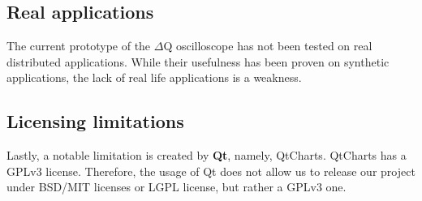     \subsection{Real applications}
       The current prototype of the $\Delta$Q oscilloscope has not been tested on real distributed applications. While their usefulness has been proven on synthetic applications, the lack of real life applications is a weakness.

    \subsection{Licensing limitations}
    Lastly, a notable limitation is created by \textbf{Qt}, namely, QtCharts. QtCharts has a GPLv3 license. Therefore, the usage of Qt does not allow us to release our project under BSD/MIT licenses or LGPL license, but rather a GPLv3 one. \cite{qt-gpl}
